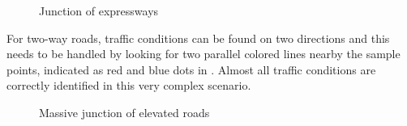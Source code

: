 \begin{figure}[th]
	\centering
	\caption{Junction of expressways}
	\label{fig:junction}
\end{figure}


For two-way roads, traffic conditions can be found on two directions
and this needs to be handled by looking for two parallel colored lines
nearby the sample points, indicated as red and blue dots in 
.  Almost all traffic conditions are correctly
identified in this very complex scenario.

\begin{figure}[th]
	\centering
	\caption{Massive junction of elevated roads}
	\label{fig:elevated}
\end{figure}

